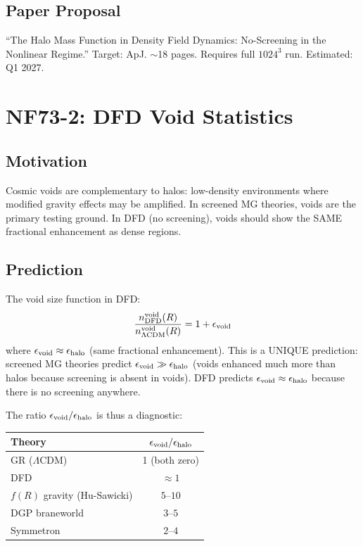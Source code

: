 \documentclass[11pt,a4paper]{article}
\begin{document}
\subsection{Paper Proposal}
``The Halo Mass Function in Density Field Dynamics: No-Screening in the Nonlinear Regime.'' Target: ApJ. $\sim$18 pages. Requires full $1024^3$ run. Estimated: Q1 2027.

\section{NF73-2: DFD Void Statistics}

\subsection{Motivation}
Cosmic voids are complementary to halos: low-density environments where modified gravity effects may be amplified. In screened MG theories, voids are the primary testing ground. In DFD (no screening), voids should show the SAME fractional enhancement as dense regions.

\subsection{Prediction}
The void size function in DFD:
\[
\frac{n_{\rm DFD}^{\rm void}(R)}{n_{\rm \Lambda CDM}^{\rm void}(R)} = 1 + \epsilon_{\rm void}
\]
where $\epsilon_{\rm void} \approx \epsilon_{\rm halo}$ (same fractional enhancement). This is a UNIQUE prediction: screened MG theories predict $\epsilon_{\rm void} \gg \epsilon_{\rm halo}$ (voids enhanced much more than halos because screening is absent in voids). DFD predicts $\epsilon_{\rm void} \approx \epsilon_{\rm halo}$ because there is no screening anywhere.

The ratio $\epsilon_{\rm void}/\epsilon_{\rm halo}$ is thus a diagnostic:
\begin{center}
\begin{tabular}{lc}
\toprule
\textbf{Theory} & $\epsilon_{\rm void}/\epsilon_{\rm halo}$ \\
\midrule
GR ($\Lambda$CDM) & 1 (both zero) \\
DFD & $\approx 1$ \\
$f(R)$ gravity (Hu-Sawicki) & $5$--$10$ \\
DGP braneworld & $3$--$5$ \\
Symmetron & $2$--$4$ \\
\bottomrule
\end{tabular}
\end{center}
\end{document}
